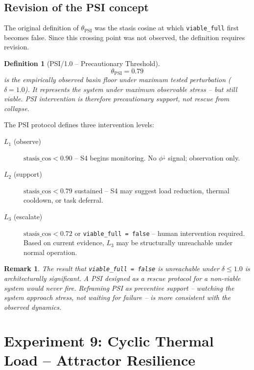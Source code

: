 \documentclass[11pt, a4paper]{article}
\newtheorem{definition}{Definition}
\newtheorem{remark}{Remark}
\begin{document}
\subsection{Revision of the PSI concept}

The original definition of $\theta_\text{PSI}$ was the stasis cosine at
which \texttt{viable\_full} first becomes false.
Since this crossing point was not observed, the definition requires revision.

\begin{definition}[PSI/1.0 -- Precautionary Threshold]
\label{def:psi}
\begin{equation}
\theta_\text{PSI} = 0.79
\end{equation}
is the empirically observed basin floor under maximum tested perturbation
($\delta = 1.0$).
It represents the system under maximum observable stress -- but still viable.
PSI intervention is therefore \emph{precautionary support}, not rescue
from collapse.
\end{definition}

The PSI protocol defines three intervention levels:
\begin{description}
  \item[$L_1$ (observe)] $\text{stasis\_cos} < 0.90$ -- S4 begins monitoring.
        No $\phi^\downarrow$ signal; observation only.
  \item[$L_2$ (support)] $\text{stasis\_cos} < 0.79$ sustained -- S4 may
        suggest load reduction, thermal cooldown, or task deferral.
  \item[$L_3$ (escalate)] $\text{stasis\_cos} < 0.72$ or
        \texttt{viable\_full = false} -- human intervention required.
        Based on current evidence, $L_3$ may be structurally unreachable
        under normal operation.
\end{description}

\begin{remark}
The result that \texttt{viable\_full = false} is unreachable under
$\delta \le 1.0$ is architecturally significant.
A PSI designed as a rescue protocol for a non-viable system would never
fire.
Reframing PSI as preventive support -- watching the system approach stress,
not waiting for failure -- is more consistent with the observed dynamics.
\end{remark}


\section{Experiment 9: Cyclic Thermal Load -- Attractor Resilience}
\label{sec:thermal_cycling}
\end{document}
